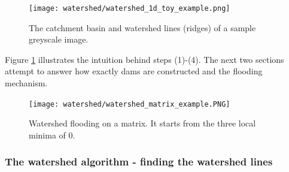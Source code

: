 \documentclass[a4paper]{article}
\begin{document}
 
 \begin{figure}[H]
	\centering %
    	\texttt{[image: watershed/watershed\_1d\_toy\_example.png]}
    \caption{The catchment basin and watershed lines (ridges) of a sample greyscale image.}
\end{figure}
 
 
 Figure \ref{fig:wshed_matrix_example} illustrates the intuition behind steps (1)-(4). The next two sections attempt to answer how exactly dams are constructed and the flooding mechanism. 

\begin{figure}[H]
    \centering
    \texttt{[image: watershed/watershed\_matrix\_example.PNG]}
    \caption{Watershed flooding on a matrix. It starts from the three local minima of $0$.}
    \label{fig:wshed_matrix_example}
\end{figure}
 
 
 
 
 \subsubsection{The watershed algorithm - finding the watershed lines}
 
\end{document}
